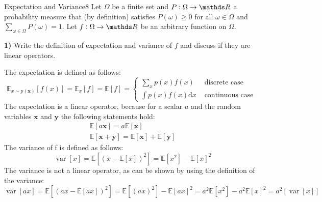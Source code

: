 \newif\ifvimbug
\vimbugfalse

\ifvimbug

\fi

 

\begin{questions}


\begin{question}{Expectation and Variance}{8}
Let $\Omega$ be a finite set and $P:\Omega\rightarrow\R$ a probability measure that (by definition) satisfies $P(\omega)\geq0$ for all $\omega\in\Omega$ and $\sum_{\omega\in\Omega}P(\omega)=1$. 
Let $f:\Omega\rightarrow\R$ be an arbitrary function on $\Omega$.

\textbf{1)} Write the definition of expectation and variance of $f$ and discuss if they are linear operators.
\begin{answer}
The expectation is defined as follows:
\begin{equation}
\mathbb{E}_{x \sim p(\mathbf{x})}[f(x)]=\mathbb{E}_{x}[f]=\mathbb{E}[f]=\left\{\begin{array}{ll}{\sum_{x} p(x) f(x)} & {\text { discrete case }} \\ {\int p(x) f(x) \mathrm{d} x} & {\text { continuous case }}\end{array}\right.
\end{equation}
The expectation is a linear operator, because for a scalar $a$ and the random variables $\mathbf{x}$ and $\mathbf{y}$ the following statements hold:
\begin{equation}
\begin{array}{l}{\mathbb{E}[a \mathbf{x}]=a \mathbb{E}[\mathbf{x}]} \\ {\mathbb{E}[\mathbf{x}+\mathbf{y}]=\mathbb{E}[\mathbf{x}]+\mathbb{E}[\mathbf{y}]}\end{array}
\end{equation}
The variance of f is defined as follows:
\begin{equation}
\operatorname{var}[x]=\mathbb{E}\left[(x-\mathbb{E}[x])^{2}\right]=\mathbb{E}\left[x^{2}\right]-\mathbb{E}[x]^{2}
\end{equation}
The variance is not a linear operator, as can be shown by using the definition of the variance:
\begin{equation}
\operatorname{var}[ax]=\mathbb{E}\left[(ax-\mathbb{E}[ax])^{2}\right]=\mathbb{E}\left[(ax)^{2}\right]-\mathbb{E}[ax]^{2}=a^{2}\mathbb{E}\left[x^{2}\right]-a^{2}\mathbb{E}[x]^{2}=a^{2}\left[\operatorname{var}[x]\right]

\end{equation}
\end{answer}
\end{question}
\end{questions}
